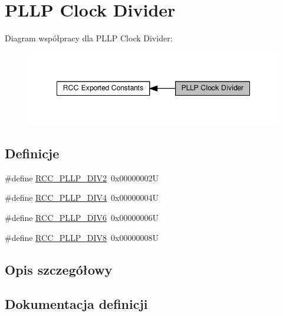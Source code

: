 \hypertarget{group___r_c_c___p_l_l_p___clock___divider}{}\section{P\+L\+LP Clock Divider}
\label{group___r_c_c___p_l_l_p___clock___divider}
Diagram współpracy dla P\+L\+LP Clock Divider\+:\nopagebreak
\begin{figure}[H]
\begin{center}
\leavevmode
\includegraphics[width=348pt]{group___r_c_c___p_l_l_p___clock___divider}
\end{center}
\end{figure}
\subsection*{Definicje}
\begin{DoxyCompactItemize}
\item 
\#define \hyperlink{group___r_c_c___p_l_l_p___clock___divider_ga16248cbd581f020b8a8d1cf0d9f0864d}{R\+C\+C\+\_\+\+P\+L\+L\+P\+\_\+\+D\+I\+V2}~0x00000002U
\item 
\#define \hyperlink{group___r_c_c___p_l_l_p___clock___divider_ga91b2c03c1f205addc5f52a1e740f801a}{R\+C\+C\+\_\+\+P\+L\+L\+P\+\_\+\+D\+I\+V4}~0x00000004U
\item 
\#define \hyperlink{group___r_c_c___p_l_l_p___clock___divider_ga5ad6be8ec0a6efaa1c81fbd29017a1fa}{R\+C\+C\+\_\+\+P\+L\+L\+P\+\_\+\+D\+I\+V6}~0x00000006U
\item 
\#define \hyperlink{group___r_c_c___p_l_l_p___clock___divider_gaab7662734bfff248c5dad97ea5f6736e}{R\+C\+C\+\_\+\+P\+L\+L\+P\+\_\+\+D\+I\+V8}~0x00000008U
\end{DoxyCompactItemize}


\subsection{Opis szczegółowy}


\subsection{Dokumentacja definicji}
\mbox{\label{group___r_c_c___p_l_l_p___clock___divider_ga16248cbd581f020b8a8d1cf0d9f0864d}} 
